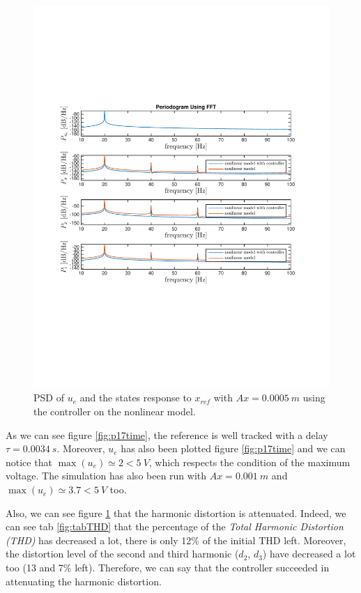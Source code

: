 \begin{figure}[H]
 \centering 
 \includegraphics[trim=0cm 7cm 0cm 7cm, clip=true, totalheight=0.35\textheight, angle=0]{figures/p17freq.pdf}
 \caption{PSD of $u_e$ and the states response to $x_{ref}$ with $Ax = 0.0005\ m$ using the controller on the nonlinear model.}
 \label{fig:p17freq}
\end{figure}

As we can see figure \ref{fig:p17time}, the reference is well tracked with a delay $\tau = 0.0034\ s$. Moreover, $u_e$ has also been plotted figure \ref{fig:p17time} and we can notice that $\max(u_e) \simeq 2 < 5\ V$, which respects the condition of the maximum voltage. The simulation has also been run with $Ax = 0.001\ m$ and $\max(u_e) \simeq 3.7 < 5\ V$ too.

Also, we can see figure \ref{fig:p17freq} that the harmonic distortion is attenuated. Indeed, we can see tab \ref{fig:tabTHD} that the percentage of the \textit{Total Harmonic Distortion (THD)} has decreased a lot, there is only 12\% of the initial THD left. Moreover, the distortion level of the second and third harmonic ($d_2$, $d_3$) have decreased a lot too (13 and 7\% left). Therefore, we can say that the controller succeeded in attenuating the harmonic distortion.

